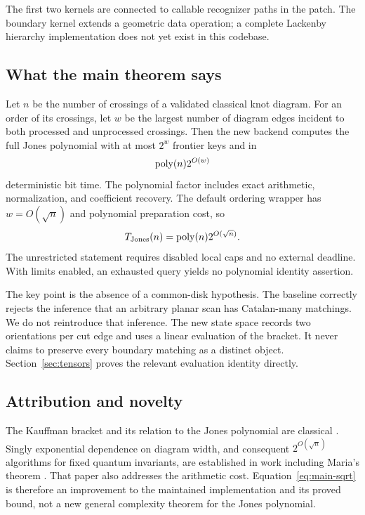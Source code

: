 The first two kernels are connected to callable recognizer paths in the
patch. The boundary kernel extends a geometric data operation; a complete
Lackenby hierarchy implementation does not yet exist in this codebase.

\subsection{What the main theorem says}

Let $n$ be the number of crossings of a validated classical knot diagram.
For an order of its crossings, let $w$ be the largest number of diagram
edges incident to both processed and unprocessed crossings. Then the new
backend computes the full Jones polynomial with at most $2^w$ frontier keys
and in
\begin{equation}\label{eq:main-width}
 \operatorname{poly}(n)2^{O(w)}
\end{equation}
deterministic bit time. The polynomial factor includes exact arithmetic,
normalization, and coefficient recovery. The default ordering wrapper has
$w=O(\sqrt n)$ and polynomial preparation cost, so
\begin{equation}\label{eq:main-sqrt}
 T_{\mathrm{Jones}}(n)=\operatorname{poly}(n)2^{O(\sqrt n)}.
\end{equation}
The unrestricted statement requires disabled local caps and no external
deadline. With limits enabled, an exhausted query yields no polynomial
identity assertion.

The key point is the absence of a common-disk hypothesis. The baseline
correctly rejects the inference that an arbitrary planar scan has
Catalan-many matchings. We do not reintroduce that inference. The new state
space records two orientations per cut edge and uses a linear evaluation
of the bracket. It never claims to preserve every boundary matching as a
distinct object. Section~\ref{sec:tensors} proves the relevant evaluation
identity directly.

\subsection{Attribution and novelty}

The Kauffman bracket and its relation to the Jones polynomial are classical
\cite{kauffman1987}. Singly exponential dependence on diagram width, and
consequent $2^{O(\sqrt n)}$ algorithms for fixed quantum invariants, are
established in work including Maria's theorem \cite{maria2021}. That paper
also addresses the arithmetic cost. Equation~\eqref{eq:main-sqrt} is
therefore an improvement to the maintained implementation and its proved
bound, not a new general complexity theorem for the Jones polynomial.

